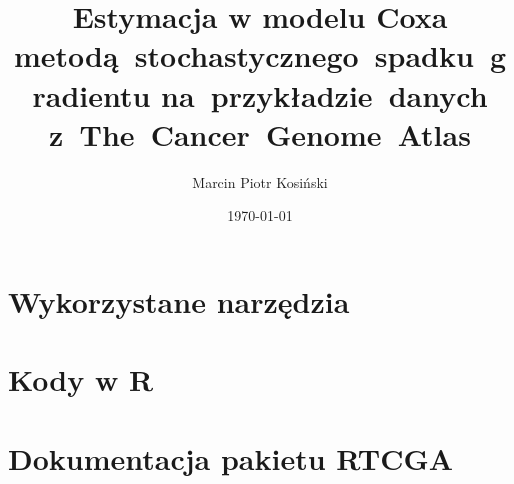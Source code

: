 \documentclass{mini}
\title{Estymacja w modelu Coxa metodą~stochastycznego~spadku~gradientu na~przykładzie~danych z~The~Cancer~Genome~Atlas}
\author{Marcin Piotr Kosiński}
\date{\today}
\begin{document}
\maketitle
\tableofcontents













\appendix

\chapter{Wykorzystane narzędzia}
\chapter{Kody w R}
\chapter{Dokumentacja pakietu RTCGA}





\makestatement
\end{document}
